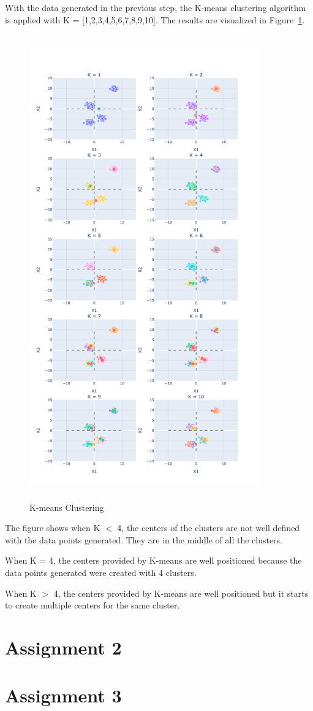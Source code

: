 \documentclass{article}
\begin{document}
With the data generated in the previous step, the K-means clustering algorithm is applied with K = [1,2,3,4,5,6,7,8,9,10]. 
The results are visualized in Figure~\ref{fig:kmeans_clustering}.

\begin{figure}[h!]
\centering
\includegraphics[width=10cm,height=20cm]{images/image2.png}
\caption{K-means Clustering}
\label{fig:kmeans_clustering}
\end{figure}

The figure shows when K $<$ 4, the centers of the clusters are not well defined with the data points generated. 
They are in the middle of all the clusters.

When K = 4, the centers provided by K-means are well positioned because the data points generated were created with 4 clusters.

When K $>$ 4, the centers provided by K-means are well positioned but it starts to create multiple centers for the same cluster.


\section*{Assignment 2}


\section*{Assignment 3}
\end{document}
